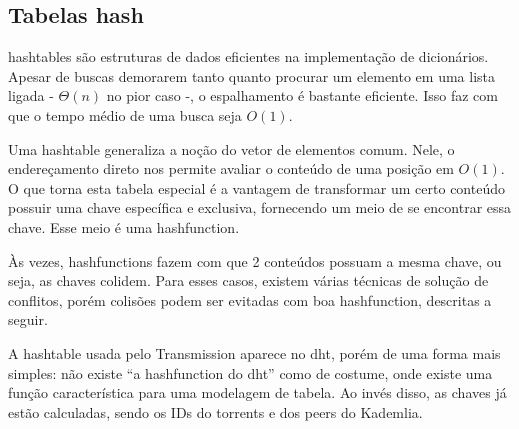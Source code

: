 
\newpage
\subsection*{Tabelas hash}

\Glspl{hashtable} são estruturas de dados eficientes na implementação de dicionários.
Apesar de buscas demorarem tanto quanto procurar um elemento em uma lista ligada -
$\Theta(n)$ no pior caso -, o espalhamento é bastante eficiente. Isso faz com que o
tempo médio de uma busca seja $O(1)$.

Uma \gls*{hashtable} generaliza a noção do vetor de elementos comum. Nele, o
endereçamento direto nos permite avaliar o conteúdo de uma posição em $O(1)$. O que
torna esta tabela especial é a vantagem de transformar um certo conteúdo possuir uma
chave específica e exclusiva, fornecendo um meio de se encontrar essa chave. Esse meio é
uma \gls{hashfunction}.

Às vezes, \glspl*{hashfunction} fazem com que 2 conteúdos possuam a mesma chave, ou
seja, as chaves colidem. Para esses casos, existem várias técnicas de solução de
conflitos, porém colisões podem ser evitadas com boa \gls*{hashfunction}, descritas a
seguir.

A \gls*{hashtable} usada pelo Transmission aparece no \gls*{dht}, porém de uma forma
mais simples: não existe ``a \gls*{hashfunction} do \gls*{dht}'' como de costume, onde
existe uma função característica para uma modelagem de tabela. Ao invés disso, as chaves
já estão calculadas, sendo os IDs do \glspl*{torrent} e dos \glspl*{peer} do Kademlia.